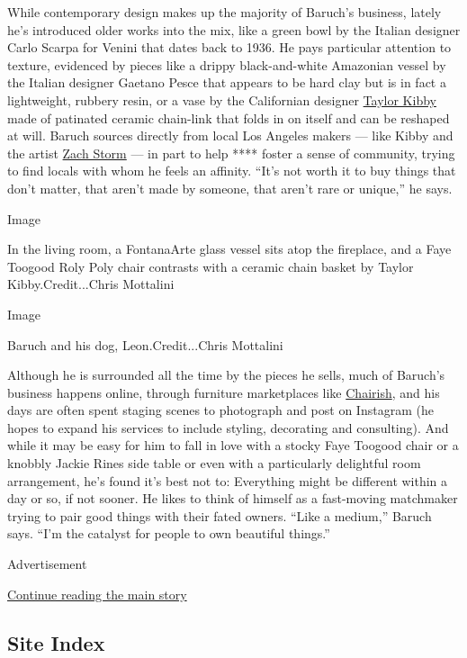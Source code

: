 While contemporary design makes up the majority of Baruch's business,
lately he's introduced older works into the mix, like a green bowl by
the Italian designer Carlo Scarpa for Venini that dates back to 1936. He
pays particular attention to texture, evidenced by pieces like a drippy
black-and-white Amazonian vessel by the Italian designer Gaetano Pesce
that appears to be hard clay but is in fact a lightweight, rubbery
resin, or a vase by the Californian designer
\href{http://taylorkibby.com/}{Taylor Kibby} made of patinated ceramic
chain-link that folds in on itself and can be reshaped at will. Baruch
sources directly from local Los Angeles makers --- like Kibby and the
artist \href{http://www.zachstorm.com/}{Zach Storm} --- in part to help
**** foster a sense of community, trying to find locals with whom he
feels an affinity. ``It's not worth it to buy things that don't matter,
that aren't made by someone, that aren't rare or unique,'' he says.

Image

In the living room, a FontanaArte glass vessel sits atop the fireplace,
and a Faye Toogood Roly Poly chair contrasts with a ceramic chain basket
by Taylor Kibby.Credit...Chris Mottalini

Image

Baruch and his dog, Leon.Credit...Chris Mottalini

Although he is surrounded all the time by the pieces he sells, much of
Baruch's business happens online, through furniture marketplaces like
\href{https://www.chairish.com/shop/rhett}{Chairish}, and his days are
often spent staging scenes to photograph and post on Instagram (he hopes
to expand his services to include styling, decorating and consulting).
And while it may be easy for him to fall in love with a stocky Faye
Toogood chair or a knobbly Jackie Rines side table or even with a
particularly delightful room arrangement, he's found it's best not to:
Everything might be different within a day or so, if not sooner. He
likes to think of himself as a fast-moving matchmaker trying to pair
good things with their fated owners. ``Like a medium,'' Baruch says.
``I'm the catalyst for people to own beautiful things.''

Advertisement

\protect\hyperlink{after-bottom}{Continue reading the main story}

\hypertarget{site-index}{%
\subsection{Site Index}\label{site-index}}

